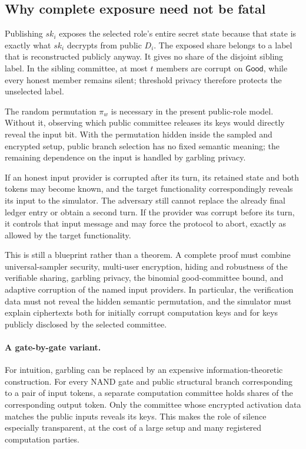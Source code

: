 \subsection{Why complete exposure need not be fatal}

Publishing $sk_i$ exposes the selected role's entire secret state because
that state is exactly what $sk_i$ decrypts from public $D_i$. The exposed
share belongs to a label that is reconstructed publicly anyway. It gives no
share of the disjoint sibling label. In the sibling committee, at most $t$
members are corrupt on $\mathsf{Good}$, while every honest member remains
silent; threshold privacy therefore protects the unselected label.

The random permutation $\pi_w$ is necessary in the present public-role
model. Without it, observing which public committee releases its keys would
directly reveal the input bit. With the permutation hidden inside the sampled
and encrypted setup, public branch selection has no fixed semantic meaning;
the remaining dependence on the input is handled by garbling privacy.

If an honest input provider is corrupted after its turn, its retained state
and both tokens may become known, and the target functionality correspondingly
reveals its input to the simulator. The adversary still cannot replace the
already final ledger entry or obtain a second turn. If the provider was
corrupt before its turn, it controls that input message and may force the
protocol to abort, exactly as allowed by the target functionality.

This is still a blueprint rather than a theorem. A complete proof must
combine universal-sampler security, multi-user encryption, hiding and
robustness of the verifiable sharing, garbling privacy, the binomial
good-committee bound, and adaptive corruption of the named input providers.
In particular, the verification data must not reveal the hidden semantic
permutation, and the simulator must explain ciphertexts both for initially
corrupt computation keys and for keys publicly disclosed by the selected
committee.

\paragraph{A gate-by-gate variant.}
For intuition, garbling can be replaced by an expensive
information-theoretic construction. For every NAND gate and public structural
branch corresponding to a pair of input tokens, a separate computation
committee holds shares of the corresponding output token. Only the committee
whose encrypted activation data matches the public inputs reveals its keys.
This makes the role of silence especially transparent, at the cost of a large
setup and many registered computation parties.
